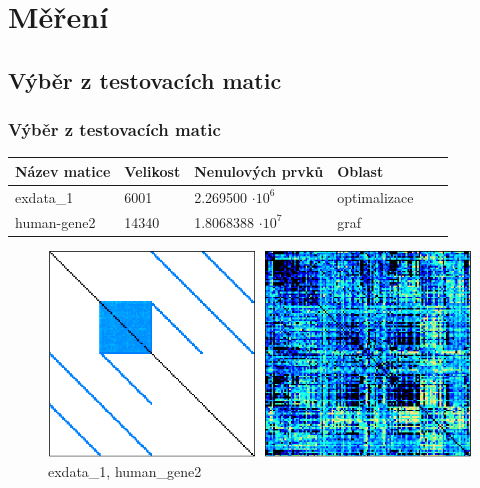 \documentclass{beamer}
\begin{document}
\section{Měření}


\subsection{Výběr z testovacích matic}
\begin{frame}
	\frametitle{Výběr z testovacích matic}
	
	\begin{table}[H]
	   \begin{tabular}{llllll}
	    Název matice & Velikost & Nenulových prvků            & Oblast                  \\
	    \hline
	    exdata\_1   &  6001    & 2.269500 $\cdot 10^6$ & optimalizace \\
	    human-gene2 & 14340    & 1.8068388 $\cdot 10^7$ & graf         \\
	    \end{tabular}
	\end{table}		
	
	\begin{figure}
		\centering
		\includegraphics[width=1.0\textwidth]{./images/mtxs2}
		\caption{exdata\_1, human\_gene2}
	\end{figure}	
\end{frame}
\end{document}

